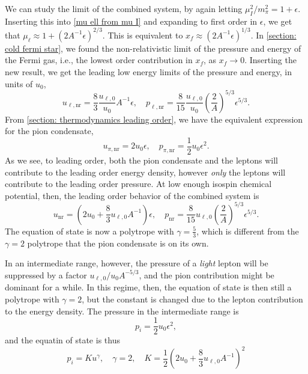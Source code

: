 We can study the limit of the combined system, by again letting $\mu_I^2/m_\pi^2 = 1 + \epsilon$.
Inserting this into \autoref{mu ell from mu I} and expanding to first order in $\epsilon$, we get that $\mu_\ell \approx 1 + (2 A^{-1} \epsilon)^{2/3} $.
This is equivalent to $x_f \approx (2 A^{-1} \epsilon)^{1/3} $.
In \autoref{section: cold fermi star}, we found the non-relativistic limit of the pressure and energy of the Fermi gas, i.e., the lowest order contribution in $x_f$, as $x_f \rightarrow 0$.
Inserting the new result, we get the leading low energy limits of the pressure and energy, in units of $u_0$, 
%
\begin{equation}
    u_{\ell, \text{nr}} = \frac{8}{3} \frac{u_{\ell,0}}{u_0} A^{-1} \epsilon, \quad
    p_{\ell, \text{nr}} = \frac{8}{15} \frac{u_{\ell,0}}{u_0} \left(\frac{2}{A} \right)^{5/3} \epsilon^{5/3}.
\end{equation}
%
From \autoref{section: thermodynamics leading order}, we have the equivalent expression for the pion condensate,
%
\begin{equation}
    u_{\pi, \text{nr}} = 2 u_0 \epsilon, \quad p_{\pi, \text{nr}} = \frac{1}{2} u_0 \epsilon^2.
\end{equation}
%
As we see, to leading order, both the pion condensate and the leptons will contribute to the leading order energy density, however \emph{only} the leptons will contribute to the leading order pressure.
At low enough isospin chemical potential, then, the leading order behavior of the combined system is
%
\begin{equation}
    u_{\text{nr}} = \left(2 u_0 + \frac{8}{3} u_{\ell,0} A^{-1} \right)\epsilon ,\quad
    p_{\text{nr}} = \frac{8}{15} u_{\ell,0} \left(\frac{2}{A} \right)^{5/3} \epsilon^{5/3}.
\end{equation}
%
The equation of state is now a polytrope with $\gamma = \frac{5}{3}$, which is different from the $\gamma = 2$ polytrope that the pion condensate is on its own.

In an intermediate range, however, the pressure of a \emph{light} lepton will be suppressed by a factor $u_{\ell,0}/ u_0 A^{-5/3}$, and the pion contribution might be dominant for a while.
In this regime, then, the equation of state is then still a polytrope with $\gamma = 2$, but the constant is changed due to the lepton contribution to the energy density.
The pressure in the intermediate range is
%
\begin{equation}
    p_i = \frac{1}{2} u_0 \epsilon^2,
\end{equation}
%
and the equatin of state is thus
%
\begin{equation}
    p_i = K u^\gamma, \quad \gamma = 2, \quad 
    K = \frac{1}{2} \left(2 u_0 + \frac{8}{3} u_{\ell,0} A^{-1} \right)^2
\end{equation}
%


